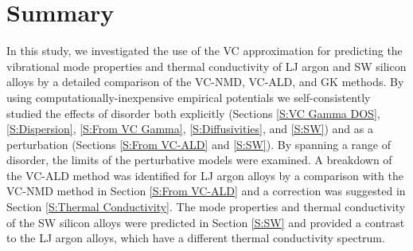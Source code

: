 \documentclass[aps,prb,onecolumn,preprint,footinbib,superscriptaddress,amsmath,amssymb,floatfix]{revtex4}
\begin{document}



\section{\label{S:Summary}Summary}

In this study, we investigated the use of the VC 
approximation for predicting the vibrational mode properties and 
thermal conductivity of LJ argon and SW silicon alloys 
by a detailed comparison of the VC-NMD, VC-ALD, and GK methods. 
By using computationally-inexpensive  
empirical potentials we self-consistently studied the effects of 
disorder both explicitly (Sections \ref{S:VC Gamma DOS}, 
\ref{S:Dispersion},  
\ref{S:From VC Gamma}, \ref{S:Diffusivities}, and \ref{S:SW}) 
and as a perturbation (Sections \ref{S:From VC-ALD} and \ref{S:SW}). 
By spanning a range of disorder, the limits of the 
perturbative models were examined.
A breakdown of the VC-ALD method was identified for LJ argon alloys 
by a comparison with the VC-NMD method in 
Section \ref{S:From VC-ALD}   
and a correction was suggested in Section \ref{S:Thermal Conductivity}. 
The mode properties and thermal 
conductivity of the SW silicon alloys were predicted in 
Section \ref{S:SW} and provided a contrast to the 
LJ argon alloys, which have a different thermal conductivity 
spectrum. 
\end{document}
